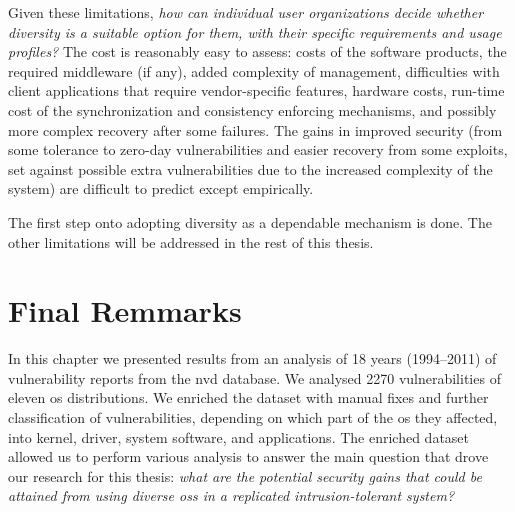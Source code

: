 Given these limitations, \emph{how can individual user organizations decide whether diversity is a suitable option for them, with their specific requirements and usage profiles?}
The cost is reasonably easy to assess: costs of the software products, the required middleware (if any), added complexity of management, difficulties with client applications that require vendor-specific features, hardware costs, run-time cost of the synchronization and consistency enforcing mechanisms, and possibly more complex recovery after some failures.
The gains in improved security (from some tolerance to zero-day vulnerabilities and easier recovery from some exploits, set against possible extra vulnerabilities due to the increased complexity of the system) are difficult to predict except empirically. 

The first step onto adopting diversity as a dependable mechanism is done. 
The other limitations will be addressed in the rest of this thesis. 


\section{Final Remmarks}

In this chapter we presented results from an analysis of 18 years (1994--2011) of vulnerability reports from the \gls{nvd}  database. 
We analysed 2270 vulnerabilities of eleven \gls{os} distributions. 
We enriched the dataset with manual fixes and further classification of vulnerabilities, depending on which part of the \gls{os} they affected, into kernel, driver, system software, and applications. The enriched dataset allowed us to perform various analysis to answer the main question that drove our research for this thesis: \emph{what are the potential security gains that could be attained from using diverse \glspl{os} in a replicated intrusion-tolerant system?}
 

